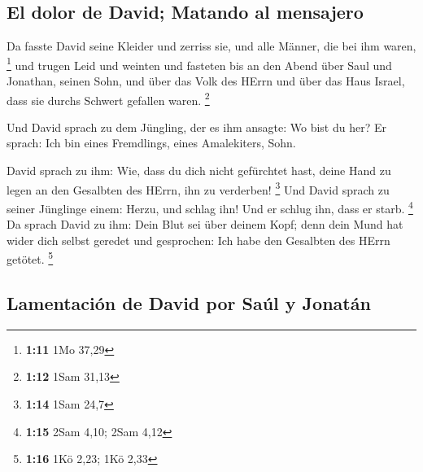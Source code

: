 \hypertarget{el-dolor-de-david-matando-al-mensajero}{%
\subsection{El dolor de David; Matando al
mensajero}\label{el-dolor-de-david-matando-al-mensajero}}

 Da fasste David seine Kleider und zerriss sie, und alle
Männer, die bei ihm waren, \footnote{\textbf{1:11} 1Mo 37,29}
 und trugen Leid und weinten und fasteten bis an den
Abend über Saul und Jonathan, seinen Sohn, und über das Volk des HErrn
und über das Haus Israel, dass sie durchs Schwert gefallen waren.
\footnote{\textbf{1:12} 1Sam 31,13}

 Und David sprach zu dem Jüngling, der es ihm ansagte: Wo
bist du her? Er sprach: Ich bin eines Fremdlings, eines Amalekiters,
Sohn.

 David sprach zu ihm: Wie, dass du dich nicht gefürchtet
hast, deine Hand zu legen an den Gesalbten des HErrn, ihn zu verderben!
\footnote{\textbf{1:14} 1Sam 24,7}  Und David sprach zu
seiner Jünglinge einem: Herzu, und schlag ihn! Und er schlug ihn, dass
er starb. \footnote{\textbf{1:15} 2Sam 4,10; 2Sam 4,12} 
Da sprach David zu ihm: Dein Blut sei über deinem Kopf; denn dein Mund
hat wider dich selbst geredet und gesprochen: Ich habe den Gesalbten des
HErrn getötet. \footnote{\textbf{1:16} 1Kö 2,23; 1Kö 2,33}

\hypertarget{lamentaciuxf3n-de-david-por-sauxfal-y-jonatuxe1n}{%
\subsection{Lamentación de David por Saúl y
Jonatán}\label{lamentaciuxf3n-de-david-por-sauxfal-y-jonatuxe1n}}

